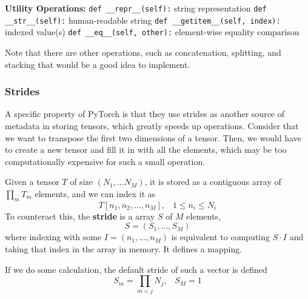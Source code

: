 \begin{algorithm}[H]
\begin{algorithmic}[1]
        \State \textbf{Utility Operations:}
        \State \texttt{def \_\_repr\_\_(self):}
            \State \hspace{2em}\Return string representation
        \State \texttt{def \_\_str\_\_(self):}
            \State \hspace{2em}\Return human-readable string
        \State \texttt{def \_\_getitem\_\_(self, index):}
            \State \hspace{2em}\Return indexed value(s)
        \State \texttt{def \_\_eq\_\_(self, other):}
            \State \hspace{2em}\Return element-wise equality comparison
    \end{algorithmic}
  \end{algorithm}

  Note that there are other operations, such as concatenation, splitting, and stacking that would be a good idea to implement.  

  \subsubsection{Strides} 

    A specific property of PyTorch is that they use strides as another source of metadata in storing tensors, which greatly speeds up operations. Consider that we want to transpose the first two dimensions of a tensor. Then, we would have to create a new tensor and fill it in with all the elements, which may be too computationally expensive for such a small operation. 

    \begin{definition}[Stride] 
      Given a tensor $T$ of size $(N_1, \ldots N_M)$, it is stored as a contiguous array of $\prod_m T_m$ elements, and we can index it as 
      \begin{equation}
        T[n_1, n_2, \ldots, n_M], \;\;\; 1 \leq n_i \leq N_i
      \end{equation} 
      To counteract this, the \textbf{stride} is a array $S$ of $M$ elements, 
      \begin{equation}
        S = (S_1, \ldots, S_M)
      \end{equation} 
      where indexing with some $I = (n_1, \ldots, n_M)$ is equivalent to computing $S \cdot I$ and taking that index in the array in memory. It defines a mapping. 
    \end{definition}

    If we do some calculation, the default stride of such a vector is defined 
    \begin{equation}
      S_m = \prod_{m < j} N_j, \;\;\; S_M = 1
    \end{equation}

